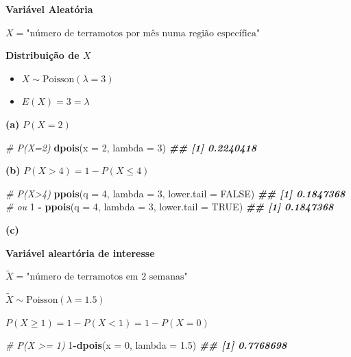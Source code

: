 \documentclass[
]{book}
\newenvironment{Shaded}{\begin{snugshade}}{\end{snugshade}}
\newcommand{\AttributeTok}[1]{\textcolor[rgb]{0.13,0.29,0.53}{#1}}
\newcommand{\CommentTok}[1]{\textcolor[rgb]{0.56,0.35,0.01}{\textit{#1}}}
\newcommand{\ConstantTok}[1]{\textcolor[rgb]{0.56,0.35,0.01}{#1}}
\newcommand{\DecValTok}[1]{\textcolor[rgb]{0.00,0.00,0.81}{#1}}
\newcommand{\DocumentationTok}[1]{\textcolor[rgb]{0.56,0.35,0.01}{\textbf{\textit{#1}}}}
\newcommand{\FloatTok}[1]{\textcolor[rgb]{0.00,0.00,0.81}{#1}}
\newcommand{\FunctionTok}[1]{\textcolor[rgb]{0.13,0.29,0.53}{\textbf{#1}}}
\newcommand{\NormalTok}[1]{#1}
\newcommand{\SpecialCharTok}[1]{\textcolor[rgb]{0.81,0.36,0.00}{\textbf{#1}}}
\providecommand{\tightlist}{%
  \setlength{\itemsep}{0pt}\setlength{\parskip}{0pt}}
\begin{document}
\textbf{Variável Aleatória}

\(X = \text{"número de terramotos por mês numa região específica"}\)

\textbf{Distribuição de \(X\)}

\begin{itemize}
\tightlist
\item
  \(X \sim \text{Poisson}(\lambda = 3)\)
\item
  \(E(X) = 3 = \lambda\)
\end{itemize}

\textbf{(a)} \(P(X=2)\)

\begin{Shaded}
\begin{Highlighting}[]
\CommentTok{\# P(X=2)}
\FunctionTok{dpois}\NormalTok{(}\AttributeTok{x =} \DecValTok{2}\NormalTok{, }\AttributeTok{lambda =} \DecValTok{3}\NormalTok{)}
\DocumentationTok{\#\# [1] 0.2240418}
\end{Highlighting}
\end{Shaded}

\textbf{(b)} \(P(X>4)=1-P(X\leq 4)\)

\begin{Shaded}
\begin{Highlighting}[]
\CommentTok{\# P(X\textgreater{}4)}
\FunctionTok{ppois}\NormalTok{(}\AttributeTok{q =} \DecValTok{4}\NormalTok{, }\AttributeTok{lambda =} \DecValTok{3}\NormalTok{, }\AttributeTok{lower.tail =} \ConstantTok{FALSE}\NormalTok{)}
\DocumentationTok{\#\# [1] 0.1847368}
\CommentTok{\# ou}
\DecValTok{1} \SpecialCharTok{{-}} \FunctionTok{ppois}\NormalTok{(}\AttributeTok{q =} \DecValTok{4}\NormalTok{, }\AttributeTok{lambda =} \DecValTok{3}\NormalTok{, }\AttributeTok{lower.tail =} \ConstantTok{TRUE}\NormalTok{)}
\DocumentationTok{\#\# [1] 0.1847368}
\end{Highlighting}
\end{Shaded}

\textbf{(c)}

\textbf{Variável aleartória de interesse}

\(\tilde{X} = \text{"número de terramotos em 2 semanas"}\)

\(\tilde{X} \sim \text{Poisson}(\lambda = 1.5)\)

\(P(X \geq 1) = 1-P(X < 1) = 1-P(X=0)\)

\begin{Shaded}
\begin{Highlighting}[]
\CommentTok{\# P(X \textgreater{}= 1)}
\DecValTok{1}\SpecialCharTok{{-}}\FunctionTok{dpois}\NormalTok{(}\AttributeTok{x =} \DecValTok{0}\NormalTok{, }\AttributeTok{lambda =} \FloatTok{1.5}\NormalTok{)}
\DocumentationTok{\#\# [1] 0.7768698}
\end{Highlighting}
\end{Shaded}
\end{document}
